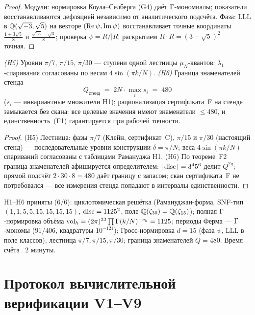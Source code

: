 \begin{proof}
Модули: нормировка Коула--Селберга (G4) даёт $\Gamma$-мономиалы;
показатели восстанавливаются дефляцией независимо от аналитического
подсчёта. Фаза: LLL в $\mathbb{Q}(\sqrt{-3},\sqrt5)$ на векторе
$(\operatorname{Re}\psi,\operatorname{Im}\psi)$ восстанавливает точные координаты
$\frac{1+3\sqrt5}{8}$ и $\frac{\sqrt{15}-\sqrt3}{8}$; проверка
$\psi=R/|R|$ раскрытием $R\cdot\bar R=(3-\sqrt5)^2$ точная.
\end{proof}

\begin{theorem}\label{th:H56}
\emph{(H5)} Уровни $\pi/7$, $\pi/15$, $\pi/30$ --- ступени одной
лестницы $\mu_N$-квантов: $\lambda_1$-спаривания согласованы по
весам $4\sin(\pi k/N)$. \emph{(H6)} Граница знаменателей стенда
\[
  Q_{\text{стенд}} \;=\; 2N\cdot\max_i s_i \;=\; 480
\]
($s_i$ --- инвариантные множители H1); рационализация
сертификата~F на стенде замыкается без скана: все целевые значения
имеют знаменатели $\le480$, и единственность~(F1) гарантируется
при рабочей точности.
\end{theorem}

\begin{proof}
(H5) Лестница: фазы $\pi/7$ (Клейн, сертификат~C), $\pi/15$ и
$\pi/30$ (настоящий стенд) --- последовательные уровни конструкции
$\delta=\pi/N$; веса $4\sin(\pi k/N)$ спариваний согласованы с
таблицами Рамануджа H1. (H6) По теореме~F2 граница знаменателей
афишируется определителем: $|\operatorname{disc}|=3^4 5^6$ делит $Q^{2g}$; прямой
подсчёт $2\cdot30\cdot8=480$ даёт границу с запасом; скан
сертификата~F не потребовался --- все измерения стенда попадают в
интервалы единственности.
\end{proof}

\begin{statusbox}
H1--H6 приняты ($6/6$): циклотомическая решётка (Рамануджан-форма,
SNF-тип $(1,1,5,5,15,15,15,15)$, $\operatorname{disc}=1125^2$, поле
$\mathbb{Q}(\zeta_{30})=\mathbb{Q}(\zeta_{15})$); полная $\Gamma$-нормировка объёма
$\mathrm{vol}_h=(2\pi)^{32}\prod\Gamma(k/N)^{-c_k}=1125$; периоды
Ферма --- $\Gamma$-мономы ($91/406$, квадратуры $10^{-121}$);
Гросс-нормировка $d=15$ (фаза $\psi$, LLL в поле классов);
лестница $\pi/7,\pi/15,\pi/30$; граница знаменателей $Q=480$.
Время счёта ~2 минуты.
\end{statusbox}

\section{Протокол вычислительной верификации V1--V9}\label{sec:protocol}

